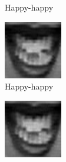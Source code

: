\begin{figure}
\begin{subfigure}[b]{0.15\textwidth}
		\caption{Happy-happy}
		\label{fig:timeseriesHappy:i}
	\end{subfigure}
	\begin{subfigure}[b]{0.15\textwidth}
		\includegraphics[width=\textwidth]{./img/timeseriesHappy/S026_006_00000010.png}
		\caption{Happy-happy}
		\label{fig:timeseriesHappy:j}
	\end{subfigure}
	\begin{subfigure}[b]{0.15\textwidth}
		\includegraphics[width=\textwidth]{./img/timeseriesHappy/S026_006_00000011.png}

\end{subfigure}
\end{figure}
